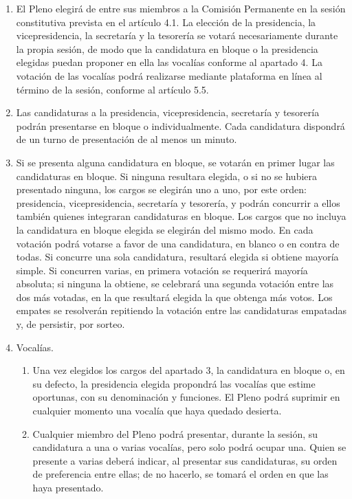 \documentclass[11pt,a4paper]{article}
\begin{document}
\begin{enumerate}
\item El Pleno elegirá de entre sus miembros a la Comisión Permanente en la sesión constitutiva prevista en el artículo 4.1. La elección de la presidencia, la vicepresidencia, la secretaría y la tesorería se votará necesariamente durante la propia sesión, de modo que la candidatura en bloque o la presidencia elegidas puedan proponer en ella las vocalías conforme al apartado 4. La votación de las vocalías podrá realizarse mediante plataforma en línea al término de la sesión, conforme al artículo 5.5.
\item Las candidaturas a la presidencia, vicepresidencia, secretaría y tesorería podrán presentarse en bloque o individualmente. Cada candidatura dispondrá de un turno de presentación de al menos un minuto.
\item Si se presenta alguna candidatura en bloque, se votarán en primer lugar las candidaturas en bloque. Si ninguna resultara elegida, o si no se hubiera presentado ninguna, los cargos se elegirán uno a uno, por este orden: presidencia, vicepresidencia, secretaría y tesorería, y podrán concurrir a ellos también quienes integraran candidaturas en bloque. Los cargos que no incluya la candidatura en bloque elegida se elegirán del mismo modo. En cada votación podrá votarse a favor de una candidatura, en blanco o en contra de todas. Si concurre una sola candidatura, resultará elegida si obtiene mayoría simple. Si concurren varias, en primera votación se requerirá mayoría absoluta; si ninguna la obtiene, se celebrará una segunda votación entre las dos más votadas, en la que resultará elegida la que obtenga más votos. Los empates se resolverán repitiendo la votación entre las candidaturas empatadas y, de persistir, por sorteo.
\item Vocalías.
  \begin{enumerate}
    \item Una vez elegidos los cargos del apartado 3, la candidatura en bloque o, en su defecto, la presidencia elegida propondrá las vocalías que estime oportunas, con su denominación y funciones. El Pleno podrá suprimir en cualquier momento una vocalía que haya quedado desierta.
    \item Cualquier miembro del Pleno podrá presentar, durante la sesión, su candidatura a una o varias vocalías, pero solo podrá ocupar una. Quien se presente a varias deberá indicar, al presentar sus candidaturas, su orden de preferencia entre ellas; de no hacerlo, se tomará el orden en que las haya presentado.

\end{enumerate}
\end{enumerate}
\end{document}

